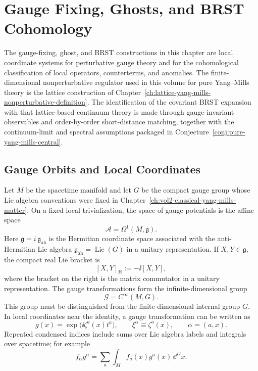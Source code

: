 \chapter{Gauge Fixing, Ghosts, and BRST Cohomology}
\label{ch:volume-ii-18}
\ConventionsMixed

\begin{remark}
The gauge-fixing, ghost, and BRST constructions in this chapter are local
coordinate systems for perturbative gauge theory and for the cohomological
classification of local operators, counterterms, and anomalies.  The
finite-dimensional nonperturbative regulator used in this volume for pure
Yang--Mills theory is the lattice construction of
Chapter~\ref{ch:lattice-yang-mills-nonperturbative-definition}.  The
identification of the covariant BRST expansion with that lattice-based
continuum theory is made through gauge-invariant observables and
order-by-order short-distance matching, together with the continuum-limit
and spectral assumptions packaged in
Conjecture~\ref{conj:pure-yang-mills-central}.
\end{remark}

\section{Gauge Orbits and Local Coordinates}

Let \(M\) be the spacetime manifold and let \(G\) be the compact gauge group
whose Lie algebra conventions were fixed in
Chapter~\ref{ch:vol2-classical-yang-mills-matter}.  On a fixed local
trivialization, the space of gauge potentials is the affine space
\[
  \mathcal A=\Omega^1(M,\mathfrak g).
\]
Here \(\mathfrak g=i\,\mathfrak g_{\mathrm{ah}}\) is the Hermitian coordinate
space associated with the anti-Hermitian Lie algebra
\(\mathfrak g_{\mathrm{ah}}=\operatorname{Lie}(G)\) in a unitary
representation.  If \(X,Y\in\mathfrak g\), the compact real Lie bracket is
\[
  [X,Y]_{\mathrm H}:=-\ii[X,Y],
\]
where the bracket on the right is the matrix commutator in a unitary
representation.
The gauge transformations form the infinite-dimensional group
\[
  \mathcal G=C^\infty(M,G).
\]
This group must be distinguished from the finite-dimensional internal group
\(G\).  In local coordinates near the identity, a gauge transformation can be
written as
\[
  g(x)=\exp\bigl(\ii\zeta^a(x)t^a\bigr),
  \qquad
  \xi^\alpha\equiv \zeta^a(x),\qquad
  \alpha=(a,x).
\]
Repeated condensed indices include sums over Lie algebra labels and integrals
over spacetime; for example
\begin{equation}
  f_\alpha g^\alpha
  =
  \sum_a\int_M f_a(x)g^a(x)\,\dd^D x .
  \label{eq:brst-condensed-index-notation}
\end{equation}

